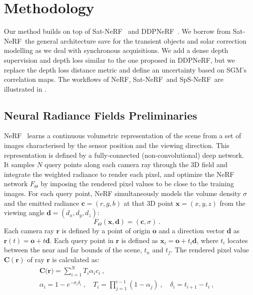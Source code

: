 \documentclass{isprs} %
\newcommand{\Nerf}{{NeRF}}
\newcommand{\OurNeRFShort}{{SpS-NeRF}}
\begin{document}
\section{Methodology}
Our method builds on top of Sat-\Nerf~\cite{mari2022sat} and DDP\Nerf~\cite{roessle2022dense}. We borrow from Sat-\Nerf~the general architecture save for the transient objects and solar correction modelling as we deal with synchronous acquisitions. We add a dense depth supervision and depth loss similar to the one proposed in DDP\Nerf, but we replace the depth loss distance metric and define an uncertainty based on SGM's correlation maps. The workflows of \Nerf, Sat-\Nerf~and \OurNeRFShort~are illustrated in .



\subsection{Neural Radiance Fields Preliminaries}
\Nerf~\cite{Mildenhall20eccv_nerf} learns a continuous volumetric representation of the scene from a set of images characterised by the sensor position and the viewing direction. This representation is defined by a fully-connected (non-convolutional) deep network. 
It samples $N$ query points along each camera ray through the 3D field and integrate the weighted radiance to render each pixel, and optimize the NeRF network $F_{\Theta}$ by imposing the rendered pixel values to be close to the training images. 
For each query point, NeRF simultaneously models the volume density $\sigma$ and the emitted radiance $\textbf{c} = (r, g, b)$ at that 3D point $\textbf{x} = (x, y, z)$ from the viewing angle $\textbf{d} = (d_x, d_y, d_z)$:\\
\begin{equation}
F_{\Theta}(\textbf{x}, \textbf{d}) = (\textbf{c}, \sigma)~.  
\end{equation}
Each camera ray $\textbf{r}$ is defined by a point of origin $\textbf{o}$ and a direction vector $\textbf{d}$ as $\textbf{r}(t) = \textbf{o} + t\textbf{d}$. Each query point in $\textbf{r}$ is defined as $\textbf{x}_i = \textbf{o} + t_i\textbf{d}$, where $t_i$ locates between the near and far bounds of the scene, $t_n$ and $t_f$. The rendered pixel value $\textbf{C}(\textbf{r})$ of ray $\textbf{r}$ is calculated as:
\begin{gather}
    \textbf{C(r)} = \sum_{i=1}^{N} {T_i {\alpha}_i c_i}~, \nonumber\\[1ex]
    {\alpha}_i = 1 - e^{-{\sigma}_i {\delta}_i}~,\quad 
    T_i = \prod_{j=1}^{i-1} ({1 - {\alpha}_j})~, \quad 
    {\delta}_i = t_{i+1} - t_i~,
    \label{NeRFCr}
\end{gather}
\end{document}
